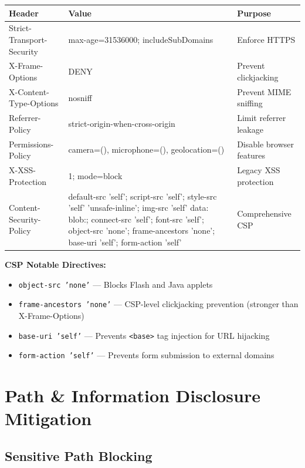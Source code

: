 \documentclass[11pt,a4paper]{article}
\begin{document}
\begin{center}
\small
\begin{tabularx}{\textwidth}{lXl}
\toprule
\textbf{Header} & \textbf{Value} & \textbf{Purpose} \\
\midrule
Strict-Transport-Security & max-age=31536000; includeSubDomains & Enforce HTTPS \\
X-Frame-Options & DENY & Prevent clickjacking \\
X-Content-Type-Options & nosniff & Prevent MIME sniffing \\
Referrer-Policy & strict-origin-when-cross-origin & Limit referrer leakage \\
Permissions-Policy & camera=(), microphone=(), geolocation=() & Disable browser features \\
X-XSS-Protection & 1; mode=block & Legacy XSS protection \\
Content-Security-Policy & default-src 'self'; script-src 'self'; style-src 'self' 'unsafe-inline'; img-src 'self' data: blob:; connect-src 'self'; font-src 'self'; object-src 'none'; frame-ancestors 'none'; base-uri 'self'; form-action 'self' & Comprehensive CSP \\
\bottomrule
\end{tabularx}
\end{center}

\textbf{CSP Notable Directives:}
\begin{itemize}[nosep]
  \item \texttt{object-src 'none'} — Blocks Flash and Java applets
  \item \texttt{frame-ancestors 'none'} — CSP-level clickjacking prevention (stronger than X-Frame-Options)
  \item \texttt{base-uri 'self'} — Prevents \texttt{<base>} tag injection for URL hijacking
  \item \texttt{form-action 'self'} — Prevents form submission to external domains
\end{itemize}

\section{Path \& Information Disclosure Mitigation}

\subsection{Sensitive Path Blocking}
\end{document}
